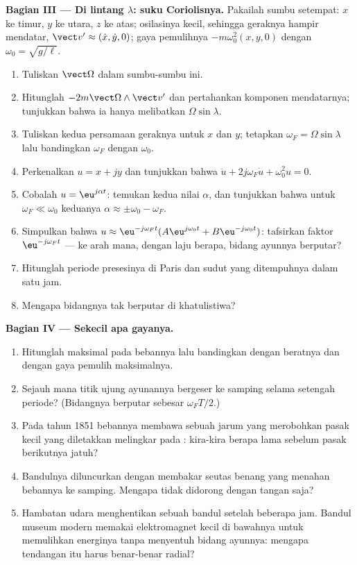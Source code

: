 \begin{problem}
\medskip
\noindent\textbf{Bagian III --- Di lintang $\lambda$: suku Coriolisnya.}
Pakailah sumbu setempat: $x$ ke timur, $y$ ke utara, $z$ ke atas; osilasinya kecil, sehingga
geraknya hampir mendatar, $\vect v' \approx (\dot x, \dot y, 0)$; gaya
pemulihnya $-m\omega_0^2(x, y, 0)$ dengan $\omega_0 = \sqrt{g/\ell}$.
\begin{enumerate}[resume]
  \item Tuliskan $\vect\Omega$ dalam sumbu-sumbu ini.
  \item Hitunglah $-2m\vect\Omega\wedge\vect v'$ dan pertahankan komponen
        mendatarnya; tunjukkan bahwa ia hanya melibatkan $\Omega\sin\lambda$.
  \item Tuliskan kedua persamaan geraknya untuk $x$ dan $y$; tetapkan
        $\omega_F = \Omega\sin\lambda$ lalu bandingkan $\omega_F$ dengan $\omega_0$.
  \item Perkenalkan $u = x + jy$ dan tunjukkan bahwa $\ddot u + 2j\omega_F\dot u +
        \omega_0^2u = 0$.
  \item Cobalah $u = \eu^{j\alpha t}$: temukan kedua nilai $\alpha$, dan
        tunjukkan bahwa untuk $\omega_F \ll \omega_0$ keduanya $\alpha \approx \pm\omega_0
        - \omega_F$.
  \item Simpulkan bahwa $u \approx \eu^{-j\omega_Ft}(A\eu^{j\omega_0t} + B\eu^{-j\omega_0t})$:
        tafsirkan faktor $\eu^{-j\omega_Ft}$ --- ke arah mana, dengan laju
        berapa, bidang ayunnya berputar?
  \item Hitunglah periode presesinya di Paris dan sudut yang ditempuhnya dalam
        satu jam.
  \item Mengapa bidangnya tak berputar di khatulistiwa?
\end{enumerate}

\medskip
\noindent\textbf{Bagian IV --- Sekecil apa gayanya.}
\begin{enumerate}[resume]
  \item Hitunglah  maksimal pada bebannya lalu bandingkan
        dengan beratnya dan dengan gaya pemulih maksimalnya.
  \item Sejauh mana titik ujung ayunannya bergeser ke samping selama
        setengah periode? (Bidangnya berputar sebesar $\omega_FT/2$.)
  \item Pada tahun 1851 bebannya membawa sebuah jarum yang merobohkan pasak kecil
        yang diletakkan melingkar pada : kira-kira berapa lama sebelum
        pasak berikutnya jatuh?
  \item Bandulnya diluncurkan dengan membakar seutas benang yang menahan bebannya
        ke samping. Mengapa tidak didorong dengan tangan saja?
  \item Hambatan udara menghentikan sebuah bandul setelah beberapa jam. Bandul
        museum modern memakai elektromagnet kecil di bawahnya untuk memulihkan
        energinya tanpa menyentuh bidang ayunnya: mengapa tendangan itu harus
        benar-benar radial?
\end{enumerate}


\end{problem}
